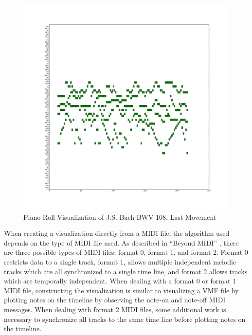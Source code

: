 \begin{figure}
  \begin{center}
    \includegraphics[scale=0.35]{resources/bwv108PianoRoll}
    \caption{Piano Roll Visualization of J.S. Bach BWV 108, Last Movement}
    \label{fig:bwv108PianoRoll}
  \end{center}
\end{figure}

When creating a visualization directly from a MIDI file, the algorithm used depends on the type of MIDI file used. As described in ``Beyond MIDI'' \citep*{HeSe97}, there are three possible types of MIDI files; format 0, format 1, and format 2. Format 0 restricts data to a single track, format 1, allows multiple independent melodic tracks which are all synchronized to a single time line, and format 2 allows tracks which are temporally independent. When dealing with a format 0 or format 1 MIDI file, constructing the visualization is similar to visualizing a VMF file by plotting notes on the timeline by observing the note-on and note-off MIDI messages. When dealing with format 2 MIDI files, some additional work is necessary to synchronize all tracks to the same time line before plotting notes on the timeline.

